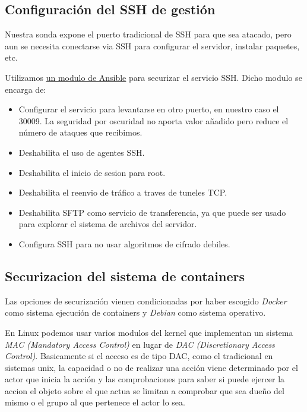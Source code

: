 \subsection{Configuración del SSH de gestión}

Nuestra sonda expone el puerto tradicional de SSH para que sea atacado, pero aun se necesita conectarse via SSH para configurar el servidor,
instalar paquetes, etc.

Utilizamos \href{https://github.com/dev-sec/ansible-ssh-hardening}{un modulo de Ansible} para securizar el servicio SSH. 
Dicho modulo se encarga de:

\begin{itemize}
    \item Configurar el servicio para levantarse en otro puerto, en nuestro caso el 30009. 
    La seguridad por oscuridad no aporta valor añadido pero reduce el número de ataques que recibimos. 
    \item Deshabilita el uso de agentes SSH.
    \item Deshabilita el inicio de sesion para root.
    \item Deshabilita el reenvio de tráfico a traves de tuneles TCP.
    \item Deshabilita SFTP como servicio de transferencia, ya que puede ser usado para explorar el sistema de archivos del servidor.
    \item Configura SSH para no usar algoritmos de cifrado debiles. 
\end{itemize}

\subsection{Securizacion del sistema de containers}

Las opciones de securización vienen condicionadas por haber escogido \emph{Docker} como sistema ejecución de containers
y \emph{Debian} como sistema operativo. 

En Linux podemos usar varios modulos del kernel que implementan un sistema \emph{MAC (Mandatory Access Control)} en lugar de \emph{DAC (Discretionary Access Control)}. 
Basicamente si el acceso es de tipo DAC, como el tradicional en sistemas unix, la capacidad o no de realizar una acción viene determinado por el actor que inicia la acción y las comprobaciones
para saber si puede ejercer la accion el objeto sobre el que actua se limitan a comprobar que sea dueño del mismo o el grupo al que pertenece el actor lo sea.

